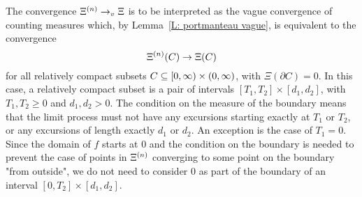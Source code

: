 \begin{note}
	The convergence
	$\Xi^{(n)} \rightarrow_v \Xi$
	is to be interpreted as the vague convergence of counting measures
	which, by Lemma~\ref{L: portmanteau vague},
	is equivalent to the convergence
	\begin{equation}
	\Xi^{(n)}(C) \rightarrow \Xi(C)
	\end{equation}
	for all relatively compact subsets
	$C \subseteq [0, \infty) \times (0, \infty)$,
	with $\Xi(\partial C) = 0$.
	In this case, a relatively compact subset is a pair of intervals
	$[T_1, T_2] \times [d_1, d_2]$,
	with $T_1, T_2 \geq 0$
	and $d_1, d_2 > 0$.
	The condition on the measure of the boundary means
	that the limit process must not have any excursions starting exactly at
	$T_1$ or $T_2$,
	or any excursions of length exactly $d_1$ or $d_2$.
	An exception is the case of $T_1=0$.
	Since the domain of $f$ starts at $0$
	and the condition on the boundary is needed to prevent the case of points in $\Xi^{(n)}$ converging to some point on the boundary "from outside",
	we do not need to consider $0$ as part of the boundary of an interval 
	$[0, T_2] \times [d_1, d_2]$.
\end{note}


